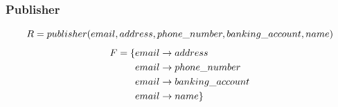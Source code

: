 \documentclass[fleqn]{scrreprt}
\begin{document}
\subsubsection{Publisher}
\begin{equation*}
    R = publisher(e\-mail, address, phone\_number, banking\_account, name)
\end{equation*}
\begin{align*}
    F = \{ & e\-mail \rightarrow address\\
           & e\-mail \rightarrow phone\_number\\
           & e\-mail \rightarrow banking\_account\\
           & e\-mail \rightarrow name\}
\end{align*}
\end{document}
